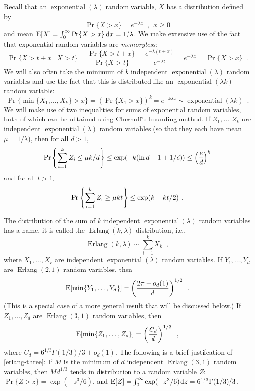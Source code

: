 \documentclass[lotsofwhite]{patmorin}
\DeclareMathOperator{\exponential}{exponential}
\DeclareMathOperator{\erlang}{Erlang}
\begin{document}
Recall that an $\exponential(\lambda)$ random variable, $X$ has a
distribution defined by
\[
   \Pr\{X>x\} = e^{-\lambda x}  \enspace , \enspace x\ge 0
\]
and mean $\mathrm{E}[X] = \int_0^{\infty}
\Pr\{X>x\}\,\mathrm{d}x = 1/\lambda$.  We make extensive use of the fact
that exponential random variables are \emph{memoryless}:
\[
    \Pr\{X > t+x\mid X>t\} = \frac{\Pr\{X> t+x\}}{\Pr\{X > t\}}
           = \frac{e^{-\lambda(t+x)}}{e^{-\lambda t}} = e^{-\lambda x} = \Pr\{X > x\} \enspace .
\]
We will also often take the minimum of $k$ independent $\exponential(\lambda)$ random variables and use the fact that this is distributed like an
$\exponential(\lambda k)$ random variable:
\[
   \Pr\{\min\{X_1,\ldots,X_k\} > x\} 
      = (\Pr\{X_1 > x\})^{k}
      = e^{-k\lambda x} \sim \exponential(\lambda k) \enspace .
\]
We will make use of two inequalities for sums of exponential random
variables, both of which can be obtained using Chernoff's bounding
method.  If $Z_1,\ldots,Z_k$ are independent $\exponential(\lambda)$
random variables (so that they each have mean $\mu=1/\lambda$), then
for all $d>1$,
\begin{equation}
    \Pr\left\{\sum_{i=1}^k Z_i \le \mu k/d\right\} \le \exp(-k(\ln d -1 + 1/d)) \le \left(\frac{e}{d}\right)^k  \eqlabel{head-bound}
\end{equation}
and for all $t>1$, 
\begin{equation}
    \Pr\left\{\sum_{i=1}^k Z_i \ge \mu k t\right\} \le \exp (k-kt/2) \enspace . \eqlabel{tail-bound}
\end{equation}

The distribution of the sum of $k$ independent $\exponential(\lambda)$
random variables has a name, it is called the $\erlang(k,\lambda)$
distribution, i.e.,
\[
    \erlang(k,\lambda) \sim \sum_{i=1}^k X_k \enspace ,
\]
where $X_1,\ldots,X_k$ are independent $\exponential(\lambda)$ random variables.
If $Y_1,\ldots,Y_d$ are $\erlang(2,1)$ random variables, then
\begin{equation}
    \E[\min\{Y_1,\ldots,Y_d\}] = \left(\frac{2\pi+o_d(1)}{d}\right)^{1/2}  \enspace . \eqlabel{erlang-two}
\end{equation}
(This is a special case of a more general result that will be discussed below.)
If $Z_1,\ldots,Z_d$ are $\erlang(3,1)$ random variables, then
\begin{equation}
    \E[\min\{Z_1,\ldots,Z_d\}] = \left(\frac{C_d}{d}\right)^{1/3}  \eqlabel{erlang-three} \enspace ,
\end{equation}
where $C_d =  6^{1/3}\Gamma (1/3) / 3 + o_d(1)$.  The following is a brief justifcation of \eqref{erlang-three}: If $M$ is the minimum of $d$ independent $\erlang(3,1)$ random 
variables, then $Md^{1/3}$ tends in distribution to a random variable 
$Z$: $\Pr\{Z>z\} = \exp(-z^3/6)$, and $\mathrm{E}[Z]= \int_0^\infty \exp(-z^3/6)\,
\mathrm{d}z = 6^{1/3}\Gamma (1/3) / 3$. 
\end{document}
